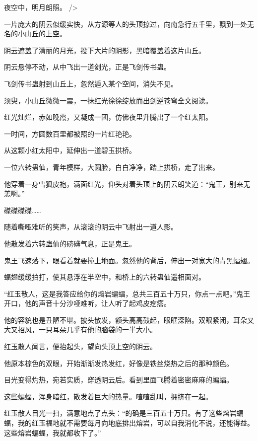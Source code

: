 
\begin{this_body}

夜空中，明月朗照。 />

一片庞大的阴云似缓实快，从方源等人的头顶掠过，向南急行五千里，飘到一处无名的小山丘的上空。

阴云遮盖了清丽的月光，投下大片的阴影，黑暗覆盖着这片山丘。

阴云悬停不动，从中飞出一道剑光，正是飞剑传书蛊。

飞剑传书蛊射到山丘上，忽然遁入某个空间，消失不见。

须臾，小山丘微微一震，一抹红光徐徐绽放而出剑逆苍穹全文阅读。

红光灿烂，赤如晚霞，又凝成一团，仿佛夜里升腾出了一个红太阳。

一时间，方圆数百里都被照的一片红艳艳。

从这颗小红太阳中，延伸出一道碧玉拱桥。

一位六转蛊仙，青年模样，大圆脸，白白净净，踏上拱桥，走了出来。

他穿着一身雪狐皮袍，满面红光，仰头对着头顶上的阴云朗笑道：“鬼王，别来无恙啊。”

磔磔磔磔……

随着嘶哑难听的笑声，从滚滚的阴云中飞射出一道人影。

他散发着六转蛊仙的磅礴气息，正是鬼王。

鬼王飞速落下，眼看着就要撞上地面。忽然他的背后，伸出一对宽大的青黑蝠翅。

蝠翅缓缓拍打，使其悬浮在半空中，和桥上的六转蛊仙遥相面对。

“红玉散人，这是我答应给你的熔岩蝙蝠，总共三百五十万只，你点一点吧。”鬼王开口，他的声音十分沙哑难听，让人听了起鸡皮疙瘩。

他的容貌也是丑陋不堪。披头散发，额头高高鼓起，眼眶深陷。双眼紧闭，耳朵又大又招风，一只耳朵几乎有他的脑袋的一半大小。

红玉散人闻言，便抬起头，望向头顶上空的阴云。

他原本棕色的双眼，开始渐渐发热发红，好像是铁丝烧热之后的那种颜色。

目光变得灼热，宛若实质，穿透阴云后。看到里面飞腾着密密麻麻的蝙蝠。

这些蝙蝠，浑身暗红，散发着巨大的热量。喳喳乱叫，拥挤在一起。

红玉散人目光一扫，满意地点了点头：“的确是三百五十万只。有了这些熔岩蝙蝠，我的红玉福地就不需要每月向地底排出熔岩，可以自我消化不说，还能得益。这些熔岩蝙蝠，我就都收下了。”


\end{this_body}
